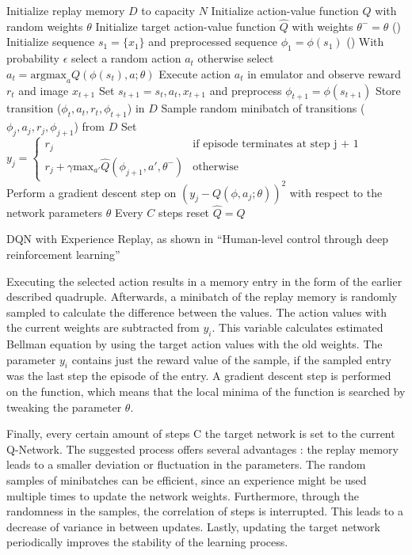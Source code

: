 \begin{algorithm}[H]
    \DontPrintSemicolon
    Initialize replay memory $D$ to capacity $N$ \;
    Initialize action-value function $Q$ with random weights $\theta$ \;
    Initialize target action-value function $\hat{Q}$ with weights $\theta^{-} = \theta$ \;
    \For(){}{
        Initialize sequence $s_1 = \{x_1\}$ and preprocessed sequence $\phi_1 = \phi(s_1)$ \;
        \For(){}{
            With probability $\epsilon$ select a random action $a_t$ \;
            otherwise select $a_t = \text{argmax}_a Q(\phi(s_t), a; \theta)$ \;
            Execute action $a_t$ in emulator and observe reward $r_t$ and image $x_{t+1}$ \;
            Set $s_{t+1} = s_{t}, a_{t}, x_{t+1}$ and preprocess $\phi_{t+1}=\phi(s_{t+1})$ \;
            Store transition ($\phi_{t}, a_{t}, r_{t}, \phi_{t+1}$) in $D$ \;
            Sample random minibatch of transitions ($\phi_{j}, a_{j}, r_{j}, \phi_{j+1}$) from $D$ \;
            Set $y_j = \begin{cases}
                r_j & \text{if episode terminates at step j + 1}\\
                r_j + \gamma \text{max}_{a'} \hat{Q}(\phi_{j+1}, a', \theta^{-}) & \text{otherwise}
                \end{cases}$  \;
            Perform a gradient descent step on $\left( y_j - Q(\phi, a_j ; \theta) \right) ^2$ with respect to the network parameters $\theta$ \;
            Every $C$ steps reset $\hat{Q} = Q$
        }
    }
    \caption{DQN with Experience Replay, as shown in ``Human-level control through deep reinforcement learning'' \cite{mnka15}}\label{algo:dqn_algo_code}
\end{algorithm}

Executing the selected action results in a memory entry in the form of the earlier described quadruple. Afterwards, a minibatch of the replay memory is randomly sampled to calculate the difference between the values. The action values with the current weights are subtracted from $y_i$. This variable calculates estimated Bellman equation by using the target action values with the old weights. The parameter $y_i$ contains just the reward value of the sample, if the sampled entry was the last step the episode of the entry. A gradient descent step is performed on the function, which means that the local minima of the function is searched by tweaking the parameter $\theta$. 

Finally, every certain amount of steps C the target network is set to the current Q-Network. The suggested process offers several advantages \cite{mnka15}: the replay memory leads to a smaller deviation or fluctuation in the parameters. The random samples of minibatches can be efficient, since an experience might be used multiple times to update the network weights. Furthermore, through the randomness in the samples, the correlation of steps is interrupted. This leads to a decrease of variance in between updates. Lastly, updating the target network periodically improves the stability of the learning process.